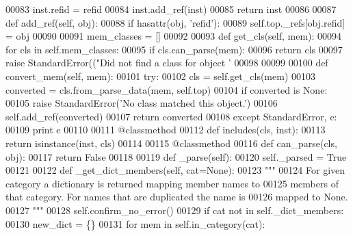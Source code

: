 \begin{DoxyCode}
00083             inst.refid = refid
00084             inst.add\_ref(inst)
00085         \textcolor{keywordflow}{return} inst
00086 
00087     \textcolor{keyword}{def }add_ref(self, obj):
00088         \textcolor{keywordflow}{if} hasattr(obj, \textcolor{stringliteral}{'refid'}):
00089             self.top.\_refs[obj.refid] = obj
00090 
00091     mem\_classes = []
00092 
00093     \textcolor{keyword}{def }get_cls(self, mem):
00094         \textcolor{keywordflow}{for} cls \textcolor{keywordflow}{in} self.mem_classes:
00095             \textcolor{keywordflow}{if} cls.can_parse(mem):
00096                 \textcolor{keywordflow}{return} cls
00097         \textcolor{keywordflow}{raise} StandardError((\textcolor{stringliteral}{"Did not find a class for object '%
00098                                  %
00099 
00100     \textcolor{keyword}{def }convert_mem(self, mem):
00101         \textcolor{keywordflow}{try}:
00102             cls = self.get_cls(mem)
00103             converted = cls.from_parse_data(mem, self.top)
00104             \textcolor{keywordflow}{if} converted \textcolor{keywordflow}{is} \textcolor{keywordtype}{None}:
00105                 \textcolor{keywordflow}{raise} StandardError(\textcolor{stringliteral}{'No class matched this object.'})
00106             self.add_ref(converted)
00107             \textcolor{keywordflow}{return} converted
00108         \textcolor{keywordflow}{except} StandardError, e:
00109             \textcolor{keywordflow}{print} e
00110 
00111     @classmethod
00112     \textcolor{keyword}{def }includes(cls, inst):
00113         \textcolor{keywordflow}{return} isinstance(inst, cls)
00114 
00115     @classmethod
00116     \textcolor{keyword}{def }can_parse(cls, obj):
00117         \textcolor{keywordflow}{return} \textcolor{keyword}{False}
00118 
00119     \textcolor{keyword}{def }_parse(self):
00120         self._parsed = \textcolor{keyword}{True}
00121 
00122     \textcolor{keyword}{def }_get_dict_members(self, cat=None):
00123         \textcolor{stringliteral}{"""}
00124 \textcolor{stringliteral}{        For given category a dictionary is returned mapping member names to}
00125 \textcolor{stringliteral}{        members of that category.  For names that are duplicated the name is}
00126 \textcolor{stringliteral}{        mapped to None.}
00127 \textcolor{stringliteral}{        """}
00128         self.confirm_no_error()
00129         \textcolor{keywordflow}{if} cat \textcolor{keywordflow}{not} \textcolor{keywordflow}{in} self._dict_members:
00130             new\_dict = \{\}
00131             \textcolor{keywordflow}{for} mem \textcolor{keywordflow}{in} self.in_category(cat):
}
\end{DoxyCode}
